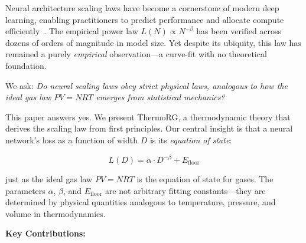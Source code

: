 \documentclass[11pt, a4paper]{article}
\theoremstyle{plain}
\begin{document}
Neural architecture scaling laws have become a cornerstone of modern deep learning, enabling practitioners to predict performance and allocate compute efficiently~\citep{kaplan2020scaling,hoffmann2022training}. The empirical power law $L(N) \propto N^{-\beta}$ has been verified across dozens of orders of magnitude in model size. Yet despite its ubiquity, this law has remained a purely \emph{empirical} observation---a curve-fit with no theoretical foundation.

We ask: \emph{Do neural scaling laws obey strict physical laws, analogous to how the ideal gas law $PV = NRT$ emerges from statistical mechanics?}

This paper answers yes. We present ThermoRG, a thermodynamic theory that derives the scaling law from first principles. Our central insight is that a neural network's loss as a function of width $D$ is its \emph{equation of state}:

\begin{equation}
\boxed{L(D) = \alpha \cdot D^{-\beta} + E_{\mathrm{floor}}}
\end{equation}

just as the ideal gas law $PV = NRT$ is the equation of state for gases. The parameters $\alpha$, $\beta$, and $E_{\mathrm{floor}}$ are not arbitrary fitting constants---they are determined by physical quantities analogous to temperature, pressure, and volume in thermodynamics.

\bigskip\noindent\textbf{Key Contributions:}
\end{document}

